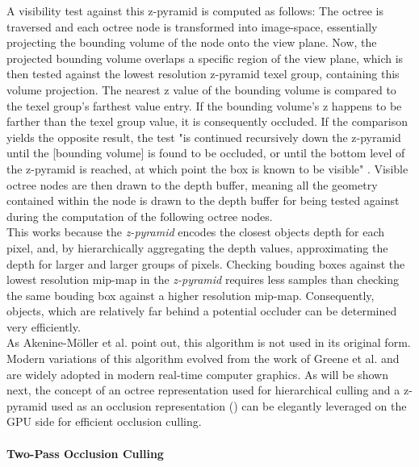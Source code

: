 \noindent
A visibility test against this z-pyramid is computed as follows: The octree is traversed and each octree node 
is transformed into image-space, essentially projecting the bounding volume of the node onto the view plane. Now, 
the projected bounding volume overlaps a specific region of the view plane, which is then tested against the lowest 
resolution z-pyramid texel group, containing this volume projection. The nearest z value of the bounding volume is 
compared to the texel group's farthest value entry. If the bounding volume's z happens to be farther than the 
texel group value, it is consequently occluded. If the comparison yields the opposite result, the test "is continued 
recursively down the z-pyramid until the [bounding volume] is found to be occluded, or until the bottom level of the 
z-pyramid is reached, at which point the box is known to be visible" \cite{AkenineMoeller2018}. Visible octree nodes 
are then drawn to the depth buffer, meaning all the geometry contained within the node is drawn to the depth buffer 
for being tested against during the computation of the following octree nodes.\\

\noindent
This works because the \emph{z-pyramid} encodes the closest objects depth for each pixel, and, by hierarchically 
aggregating the depth values, approximating the depth for larger and larger groups of pixels. Checking bouding boxes 
against the lowest resolution mip-map in the \emph{z-pyramid} requires less samples than checking the same bouding 
box against a higher resolution mip-map. Consequently, objects, which are relatively far behind a potential occluder 
can be determined very efficiently. \\

\noindent 
As Akenine-Möller et al. \cite{AkenineMoeller2018} point out, this algorithm is not used in its original form. 
Modern variations of this algorithm evolved from the work of Greene et al. \cite{Greene93} and are widely adopted in 
modern real-time computer graphics. As will be shown next, the concept of an octree representation used for 
hierarchical culling and a z-pyramid used as an occlusion representation (\cite{AkenineMoeller2018}) can be elegantly 
leveraged on the \ac{GPU} side for efficient occlusion culling.


\paragraph*{Two-Pass Occlusion Culling} \label{subsubsec-two-pass-occlusion-culling}

